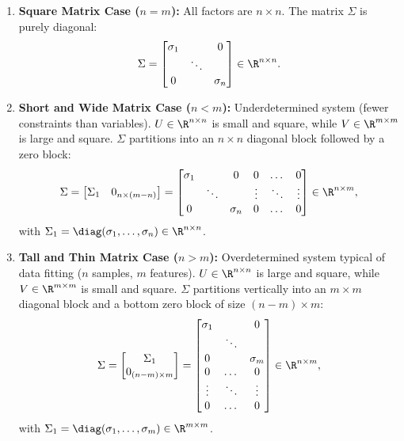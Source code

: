 \begin{enumerate}
    \item \textbf{Square Matrix Case ($n = m$):}
    All factors are $n \times n$. The matrix $\Sigma$ is purely diagonal:
    \begin{equation}
        \Sigma = \begin{bmatrix}
            \sigma_1 & & 0 \\
            & \ddots & \\
            0 & & \sigma_n
        \end{bmatrix} \in \R^{n \times n}.
    \end{equation}

    \item \textbf{Short and Wide Matrix Case ($n < m$):}
    Underdetermined system (fewer constraints than variables). $U \in \R^{n \times n}$ is small and square, while $V \in \R^{m \times m}$ is large and square. $\Sigma$ partitions into an $n \times n$ diagonal block followed by a zero block:
    \begin{equation}
        \Sigma = \begin{bmatrix} \Sigma_1 & 0_{n \times (m - n)} \end{bmatrix} = \begin{bmatrix}
            \sigma_1 & & 0 & 0 & \dots & 0 \\
            & \ddots & & \vdots & \ddots & \vdots \\
            0 & & \sigma_n & 0 & \dots & 0
        \end{bmatrix} \in \R^{n \times m},
    \end{equation}
    with $\Sigma_1 = \diag(\sigma_1, \dots, \sigma_n) \in \R^{n \times n}$.

    \item \textbf{Tall and Thin Matrix Case ($n > m$):}
    Overdetermined system typical of data fitting ($n$ samples, $m$ features). $U \in \R^{n \times n}$ is large and square, while $V \in \R^{m \times m}$ is small and square. $\Sigma$ partitions vertically into an $m \times m$ diagonal block and a bottom zero block of size $(n - m) \times m$:
    \begin{equation}
        \Sigma = \begin{bmatrix} \Sigma_1 \\ 0_{(n - m) \times m} \end{bmatrix} = \begin{bmatrix}
            \sigma_1 & & 0 \\
            & \ddots & \\
            0 & & \sigma_m \\
            0 & \dots & 0 \\
            \vdots & \ddots & \vdots \\
            0 & \dots & 0
        \end{bmatrix} \in \R^{n \times m},
    \end{equation}
    with $\Sigma_1 = \diag(\sigma_1, \dots, \sigma_m) \in \R^{m \times m}$.
\end{enumerate}

